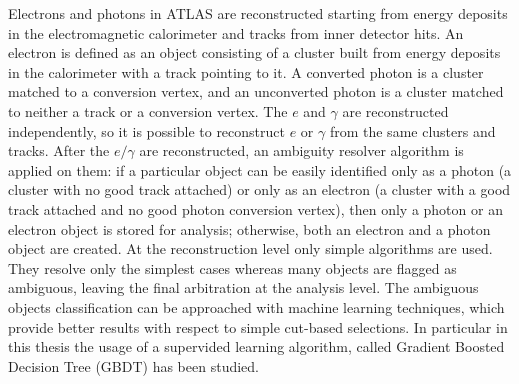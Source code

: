 \documentclass[a4paper, oneside, 11pt]{book}
\begin{document}
	
	
	
	
	\iffalse
	Electrons and photons in ATLAS are reconstructed starting from energy deposits in the electromagnetic calorimeter and tracks from inner detector hits. An electron is defined as an object consisting of a cluster built from energy deposits in the calorimeter with a track pointing to it. A converted photon is a cluster matched to a conversion vertex, and an unconverted photon is a cluster matched to neither a track or a conversion vertex. The $e$ and $\gamma$ are reconstructed independently, so it is possible to reconstruct $e$ or $\gamma$ from the same clusters and tracks. After the $e/\gamma$ are reconstructed, an ambiguity resolver algorithm is applied on them: if a particular object can be easily identified only as a photon (a cluster with no good track attached) or only as an electron (a cluster with a good track attached and no good photon conversion vertex), then only a photon or an electron object is stored for analysis; otherwise, both an electron and a photon object are created. At the reconstruction level only simple algorithms are used. They resolve only the simplest cases whereas many objects are flagged as ambiguous, leaving the final arbitration at the analysis level. The ambiguous objects classification can be approached with machine learning techniques, which provide better results with respect to simple cut-based selections. In particular in this thesis the usage of a supervided learning algorithm, called Gradient Boosted  Decision Tree (GBDT) has been studied.
	
\end{document}
